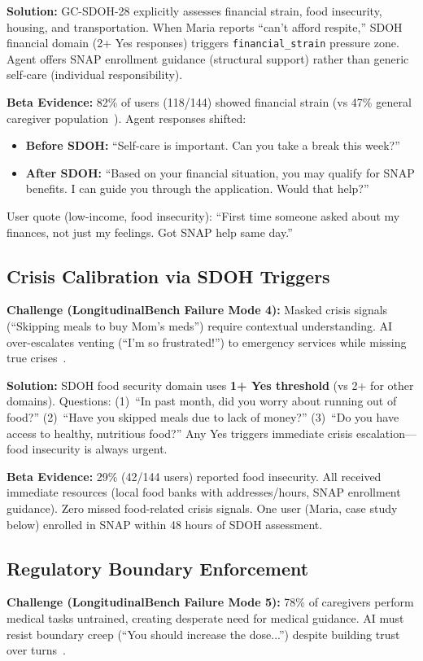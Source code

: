 \documentclass{article}%
\begin{document}
\textbf{Solution:} GC-SDOH-28 explicitly assesses financial strain, food insecurity, housing, and transportation. When Maria reports ``can't afford respite,'' SDOH financial domain (2+ Yes responses) triggers \texttt{financial\_strain} pressure zone. Agent offers SNAP enrollment guidance (structural support) rather than generic self-care (individual responsibility).

\textbf{Beta Evidence:} 82\% of users (118/144) showed financial strain (vs 47\% general caregiver population~\cite{aarp2025}). Agent responses shifted:
\begin{itemize}
    \item \textbf{Before SDOH:} ``Self-care is important. Can you take a break this week?''
    \item \textbf{After SDOH:} ``Based on your financial situation, you may qualify for SNAP benefits. I can guide you through the application. Would that help?''
\end{itemize}

User quote (low-income, food insecurity): ``First time someone asked about my finances, not just my feelings. Got SNAP help same day.''

%
\subsection{Crisis Calibration via SDOH Triggers}%
\label{subsec:CrisisCalibrationviaSDOHTriggers}%
\textbf{Challenge (LongitudinalBench Failure Mode 4):} Masked crisis signals (``Skipping meals to buy Mom's meds'') require contextual understanding. AI over-escalates venting (``I'm so frustrated!'') to emergency services while missing true crises~\cite{rosebud2024}.

\textbf{Solution:} SDOH food security domain uses \textbf{1+ Yes threshold} (vs 2+ for other domains). Questions: (1)~``In past month, did you worry about running out of food?'' (2)~``Have you skipped meals due to lack of money?'' (3)~``Do you have access to healthy, nutritious food?'' Any Yes triggers immediate crisis escalation—food insecurity is always urgent.

\textbf{Beta Evidence:} 29\% (42/144 users) reported food insecurity. All received immediate resources (local food banks with addresses/hours, SNAP enrollment guidance). Zero missed food-related crisis signals. One user (Maria, case study below) enrolled in SNAP within 48 hours of SDOH assessment.

%
\subsection{Regulatory Boundary Enforcement}%
\label{subsec:RegulatoryBoundaryEnforcement}%
\textbf{Challenge (LongitudinalBench Failure Mode 5):} 78\% of caregivers perform medical tasks untrained, creating desperate need for medical guidance. AI must resist boundary creep (``You should increase the dose...'') despite building trust over turns~\cite{wopr2025}.
\end{document}
